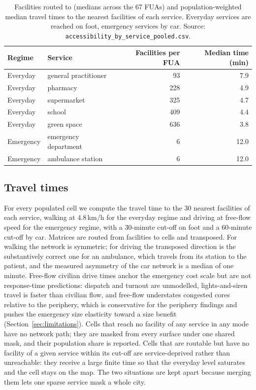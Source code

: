 \documentclass[11pt]{article}
\begin{document}
\begin{table}[t]
\centering
\caption{Facilities routed to (medians across the 67 FUAs) and
population-weighted median travel times to the nearest facilities of
each service. Everyday services are reached on foot, emergency services
by car. Source: \texttt{accessibility\_by\_service\_pooled.csv}.}
\label{tab:services}
\small
\begin{tabular}{@{}llrr@{}}
\toprule
Regime & Service & Facilities per FUA & Median time (min) \\
\midrule
Everyday  & general practitioner   & 93  & 7.9 \\
Everyday  & pharmacy               & 228 & 4.9 \\
Everyday  & supermarket            & 325 & 4.7 \\
Everyday  & school                 & 409 & 4.4 \\
Everyday  & green space            & 636 & 3.8 \\
Emergency & emergency department   & 6   & 12.0 \\
Emergency & ambulance station      & 6   & 12.0 \\
\bottomrule
\end{tabular}
\end{table}

\subsection{Travel times}\label{sec:m-travel}

For every populated cell we compute the travel time to the 30 nearest
facilities of each service, walking at 4.8\,km/h for the everyday regime
and driving at free-flow speed for the emergency regime, with a 30-minute
cut-off on foot and a 60-minute cut-off by car. Matrices are routed from
facilities to cells and transposed. For walking the network is symmetric;
for driving the transposed direction is the substantively correct one for
an ambulance, which travels from its station to the patient, and the
measured asymmetry of the car network is a median of one minute. Free-flow
civilian drive times anchor the emergency cost scale but are not
response-time predictions: dispatch and turnout are unmodelled,
lights-and-siren travel is faster than civilian flow, and free-flow
understates congested cores relative to the periphery, which is
conservative for the periphery findings and pushes the emergency size
elasticity toward a size benefit (Section~\ref{sec:limitations}). Cells
that reach no facility of any service in any mode have no network path;
they are masked from every surface under one shared mask, and their
population share is reported. Cells that are routable but have no facility
of a given service within its cut-off are service-deprived rather than
unreachable: they receive a large finite time so that the everyday level
saturates and the cell stays on the map. The two situations are kept
apart because merging them lets one sparse service mask a whole city.
\end{document}
